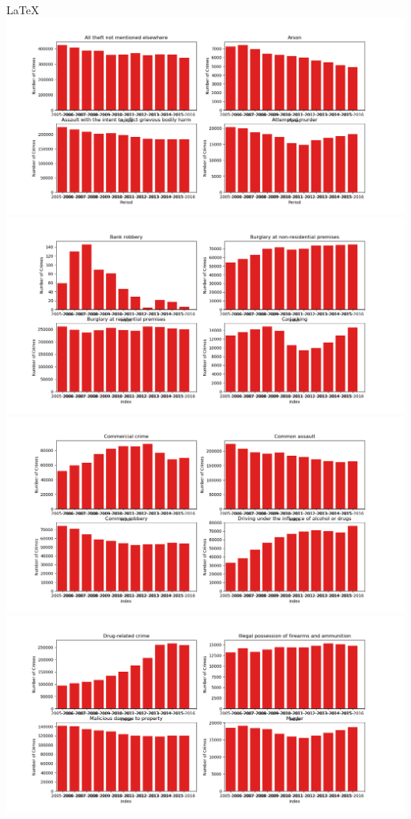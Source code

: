 \documentclass[landscape,17pt]{extarticle}
\begin{document}
\LaTeX
\includegraphics[width=\textwidth]{Catoegory/Figure_1.png}
\includegraphics[width=\textwidth]{Catoegory/Figure_2.png}
\includegraphics[width=\textwidth]{Catoegory/Figure_3.png}
\includegraphics[width=\textwidth]{Catoegory/Figure_4.png}
\end{document}
